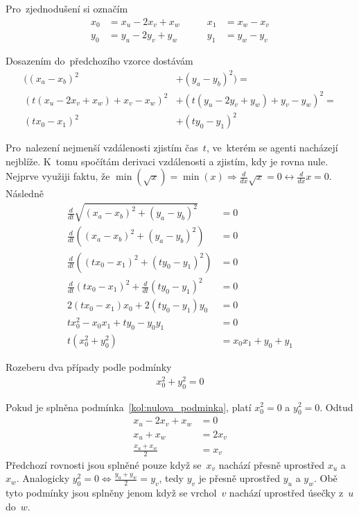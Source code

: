 Pro~zjednodušení si označím
\begin{align*}
	x_0 &= x_u - 2x_v + x_w &\qquad
	x_1 &= x_w - x_v \\
	y_0 &= y_u - 2y_v + y_w &\qquad
	y_1 &= y_w - y_v
\end{align*}

Dosazením do~předchozího vzorce dostávám
\begin{align*}
	((x_a - x_b)^2 &+ (y_a - y_b)^2) = \\
	(t(x_u - 2x_v + x_w) + x_v - x_w)^2 &+ (t(y_u - 2y_v + y_w) + y_v - y_w)^2 = \\
	(tx_0 - x_1)^2 &+ (ty_0 - y_1)^2
\end{align*}

Pro~nalezení nejmenší vzdálenosti zjistím čas~$t$, ve~kterém se agenti nacházejí nejblíže.
K~tomu spočítám derivaci vzdálenosti a zjistím, kdy je rovna nule.
Nejprve využiji faktu, že $\min\left(\sqrt{x}\right) = \min(x) \Rightarrow \frac{d}{dx} \sqrt {x} = 0 \leftrightarrow \frac{d}{dx} x=0$.
Následně
\begin{align}
	\frac{d}{dt} \sqrt{(x_a - x_b)^2 + (y_a - y_b)^2} &= 0 \nonumber \\
	\frac{d}{dt} ((x_a - x_b)^2 + (y_a - y_b)^2) &= 0 \nonumber \\
	\frac{d}{dt} ((tx_0 - x_1)^2 + (ty_0 - y_1)^2) &= 0 \nonumber \\
	\frac{d}{dt} (tx_0 - x_1)^2 + \frac{d}{dt} (ty_0 - y_1)^2 &= 0 \nonumber \\
	2(tx_0 - x_1)x_0 + 2(ty_0 - y_1)y_0 &= 0 \nonumber \\
	tx_0^2 - x_0 x_1 + ty_0 - y_0 y_1 &= 0 \nonumber \\
	t(x_0^2 + y_0^2) &= x_0 x_1 + y_0 + y_1 \label{eq:kol_d_dt}
\end{align}

Rozeberu dva případy podle podmínky
\begin{gather}
	x_0^2 + y_0^2 = 0\label{kol:nulova_podminka}
\end{gather}

Pokud je splněna podmínka~\ref{kol:nulova_podminka}, platí $x_0^2 = 0$ a $y_0^2 = 0$.
Odtud
\begin{align*}
	x_u - 2 x_v + x_w &= 0 \\
	x_u + x_w &= 2 x_v \\
	\frac{x_u + x_w}{2} &= x_v
\end{align*}
Předchozí rovnosti jsou splněné pouze když se~$x_v$ nachází přesně uprostřed $x_u$ a $x_w$.
Analogicky $y_0^2 = 0 \Leftrightarrow \frac{y_u + y_w}{2} = y_v$, tedy $y_v$ je přesně uprostřed $y_u$ a $y_w$.
Obě tyto podmínky jsou splněny jenom když se vrchol~$v$ nachází uprostřed úsečky z~$u$ do~$w$.

